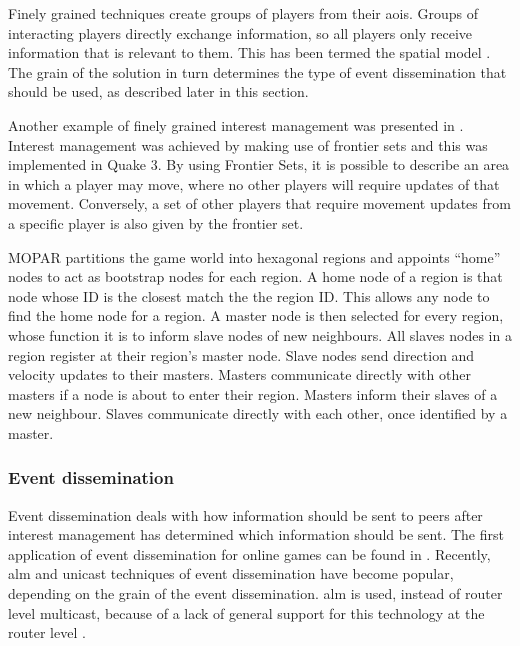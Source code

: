 \documentclass[10pt,a4paper,journal,cspaper,compsoc]{IEEEtran}
\begin{document}
Finely grained techniques create groups of players from their \acp{aoi}. Groups of interacting players directly exchange information, so all players
only receive information that is relevant to them. This has been termed the spatial model \cite{Fan_deisgn_issues_p2p}. The grain of the solution in
turn determines the type of event dissemination that should be used, as described later in this section.

Another example of finely grained interest management was presented in \cite{IM_frontier_sets}. Interest management was achieved by making use of
frontier sets and this was implemented in Quake 3. By using Frontier Sets, it is possible to describe an area in which a player may move, where no
other players will require updates of that movement. Conversely, a set of other players that require movement updates from a specific player is also
given by the frontier set.

MOPAR partitions the game world into hexagonal regions and appoints ``home'' nodes to act as bootstrap nodes for each region. A home node of a region
is that node whose ID is the closest match the the region ID. This allows any node to find the home node for a region. A master node is then selected
for every region, whose function it is to inform slave nodes of new neighbours. All slaves nodes in a region register at their region's master node.
Slave nodes send direction and velocity updates to their masters. Masters communicate directly with other masters if a node is about to enter their
region. Masters inform their slaves of a new neighbour. Slaves communicate directly with each other, once identified by a master.




\subsubsection{Event dissemination}
Event dissemination deals with how information should be sent to peers after interest management has determined which information should be sent. The
first application of event dissemination for online games can be found in \cite{first_GED}. Recently, \ac{alm} and unicast techniques of event
dissemination have become popular, depending on the grain of the event dissemination. \ac{alm} is used, instead of router level multicast, because of
a lack of general support for this technology at the router level \cite{ip_multicast_deployment_issues}.
\end{document}
